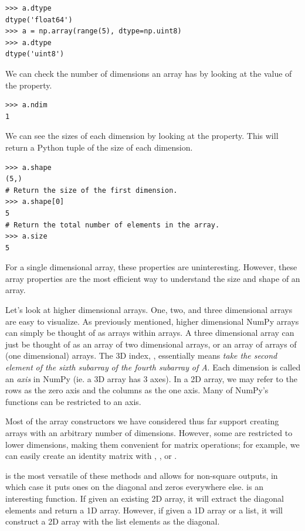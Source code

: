 \begin{lstlisting}
>>> a.dtype
dtype('float64')
>>> a = np.array(range(5), dtype=np.uint8) 
>>> a.dtype
dtype('uint8') 
\end{lstlisting} 

We can check the number of dimensions an
array has by looking at the value of the  property. 
\begin{lstlisting}
>>> a.ndim
1 
\end{lstlisting} 

We can see the sizes of each dimension by looking at
the  property. This will return a Python tuple of the size of
each dimension. 
\begin{lstlisting}
>>> a.shape
(5,)
# Return the size of the first dimension.
>>> a.shape[0]
5 
# Return the total number of elements in the array.
>>> a.size 
5
\end{lstlisting} 

For a single dimensional array, these properties are
uninteresting. However, these array properties are the most efficient way 
to understand the size and shape of an array.

Let's look at higher dimensional arrays. One, two, and three dimensional
arrays are easy to visualize. As previously mentioned, higher dimensional NumPy arrays can simply be
thought of as arrays within arrays. A three dimensional array can just
be thought of as an array of two dimensional arrays, or an array of arrays of (one dimensional) arrays. The 3D index, , essentially means \emph{take the second element}  \emph{of the sixth
subarray}  \emph{of the fourth subarray}  \emph{of A}. 
 Each dimension is called an \emph{axis} in NumPy (ie. a 3D array has 3 axes).  
In a 2D array, we may refer to the rows as the zero axis and the columns as the
one axis. Many of NumPy's functions can be restricted to an axis. 

Most of the array constructors we have considered thus far support 
creating arrays with an arbitrary number of dimensions. However, some are restricted to lower dimensions, making them convenient for matrix operations; for example, we can easily create an identity matrix with , ,
 or . 
 
 is the most versatile of these methods and allows for non-square outputs, 
in which case it puts ones on the diagonal and zeros everywhere else. 
 is an interesting function.  If given an existing 2D array, 
it will extract the diagonal elements and return a 1D array. However, if given 
a 1D array or a list, it will construct a 2D array with the list elements as the diagonal.

